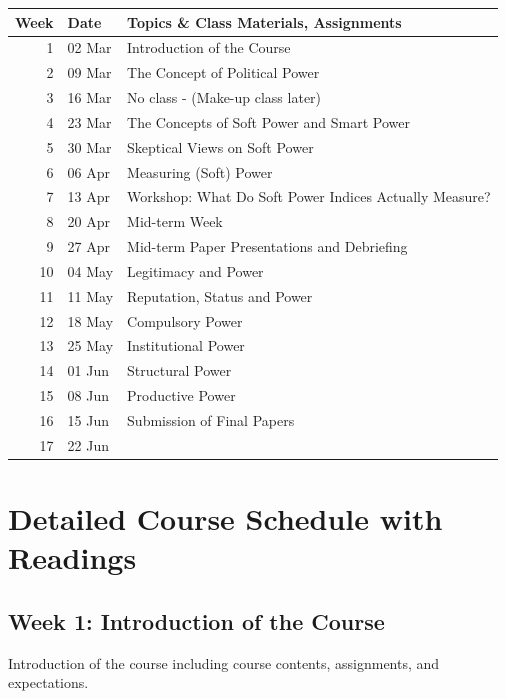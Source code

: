 \documentclass[
  letterpaper,
  DIV=11,
  numbers=noendperiod]{scrartcl}
\begin{document}
\begin{longtable}{rll}
\toprule
Week & Date & Topics \& Class Materials, Assignments \\ 
\midrule
1 & 02 Mar & Introduction of the Course \\ 
2 & 09 Mar & The Concept of Political Power \\ 
3 & 16 Mar & No class - (Make-up class later) \\ 
4 & 23 Mar & The Concepts of Soft Power and Smart Power \\ 
5 & 30 Mar & Skeptical Views on Soft Power \\ 
6 & 06 Apr & Measuring (Soft) Power \\ 
7 & 13 Apr & Workshop: What Do Soft Power Indices Actually Measure? \\ 
8 & 20 Apr & Mid-term Week \\ 
9 & 27 Apr & Mid-term Paper Presentations and Debriefing \\ 
10 & 04 May & Legitimacy and Power \\ 
11 & 11 May & Reputation, Status and Power \\ 
12 & 18 May & Compulsory Power \\ 
13 & 25 May & Institutional Power \\ 
14 & 01 Jun & Structural Power \\ 
15 & 08 Jun & Productive Power \\ 
16 & 15 Jun & Submission of Final Papers \\ 
17 & 22 Jun &  \\ 
\bottomrule
\end{longtable}

\newpage{}

\hypertarget{detailed-course-schedule-with-readings}{%
\section{\texorpdfstring{{Detailed Course Schedule with
Readings}}{Detailed Course Schedule with Readings}}\label{detailed-course-schedule-with-readings}}

\hypertarget{week-1-introduction-of-the-course}{%
\subsection*{Week 1: Introduction of the
Course}\label{week-1-introduction-of-the-course}}

Introduction of the course including course contents, assignments, and
expectations.
\end{document}
